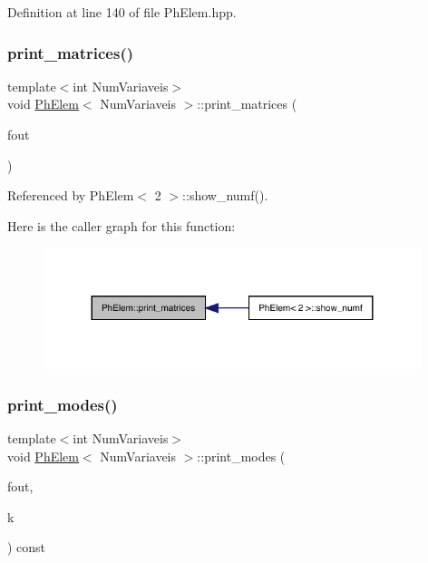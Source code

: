 Definition at line 140 of file Ph\+Elem.\+hpp.

\mbox{\label{classPhElem_a233fb1bc0c15cae815fef5d1dc8d9265}} 
\subsubsection{\texorpdfstring{print\+\_\+matrices()}{print\_matrices()}}
{\footnotesize\ttfamily template$<$int Num\+Variaveis$>$ \\
void \hyperlink{classPhElem}{Ph\+Elem}$<$ Num\+Variaveis $>$\+::print\+\_\+matrices (\begin{DoxyParamCaption}\item[{F\+I\+LE $\ast$}]{fout }\end{DoxyParamCaption})}



Referenced by Ph\+Elem$<$ 2 $>$\+::show\+\_\+numf().

Here is the caller graph for this function\+:
\nopagebreak
\begin{figure}[H]
\begin{center}
\leavevmode
\includegraphics[width=312pt]{classPhElem_a233fb1bc0c15cae815fef5d1dc8d9265_icgraph}
\end{center}
\end{figure}
\mbox{\label{classPhElem_ae7659320b2118608e38d192443bb2b8f}} 
\subsubsection{\texorpdfstring{print\+\_\+modes()}{print\_modes()}}
{\footnotesize\ttfamily template$<$int Num\+Variaveis$>$ \\
void \hyperlink{classPhElem}{Ph\+Elem}$<$ Num\+Variaveis $>$\+::print\+\_\+modes (\begin{DoxyParamCaption}\item[{F\+I\+LE $\ast$}]{fout,  }\item[{const int \&}]{k }\end{DoxyParamCaption}) const}



